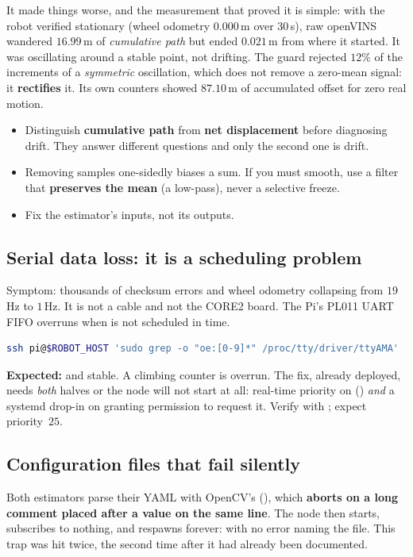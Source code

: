It made things worse, and the measurement that proved it is simple: with the
robot verified stationary (wheel odometry $0.000$\,m over $30$\,s), raw
openVINS wandered $16.99$\,m of \emph{cumulative path} but ended
$0.021$\,m from where it started. It was oscillating around a stable point,
not drifting. The guard rejected $12\%$ of the increments of a
\emph{symmetric} oscillation, which does not remove a zero-mean signal: it
\textbf{rectifies} it. Its own counters showed $87.10$\,m of accumulated
offset for zero real motion.

\begin{itemize}[leftmargin=1.4em]
\item Distinguish \textbf{cumulative path} from \textbf{net displacement}
  before diagnosing drift. They answer different questions and only the second
  one is drift.
\item Removing samples one-sidedly biases a sum. If you must smooth, use a
  filter that \textbf{preserves the mean} (a low-pass), never a selective
  freeze.
\item Fix the estimator's inputs, not its outputs.
\end{itemize}

\subsection{Serial data loss: it is a scheduling problem}
\label{ap:repro-uart}
Symptom: thousands of checksum errors and wheel odometry collapsing from
$19$\,Hz to $1$\,Hz. It is not a cable and not the CORE2 board. The Pi's
PL011 UART FIFO overruns when  is not scheduled in time.

\begin{lstlisting}[language=bash]
ssh pi@$ROBOT_HOST 'sudo grep -o "oe:[0-9]*" /proc/tty/driver/ttyAMA'
\end{lstlisting}
\textbf{Expected:}  and stable. A climbing  counter is
overrun. The fix, already deployed, needs \emph{both} halves or the node will
not start at all: real-time priority on 
() \emph{and} a  systemd drop-in on
 granting permission to request it. Verify with
; expect priority~$25$.

\subsection{Configuration files that fail silently}
\label{ap:repro-yaml}
Both estimators parse their YAML with OpenCV's 
(), which \textbf{aborts on a long comment placed after a
value on the same line}. The node then starts, subscribes to nothing, and
respawns forever: with no error naming the file. This trap was hit twice,
the second time after it had already been documented.

